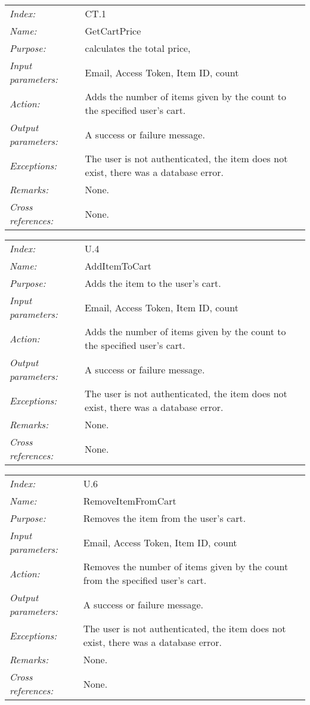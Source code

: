 \documentclass[10pt,letter]{article}
\begin{document}
\begin{tabularx}{\textwidth}{l X}
    \it{Index:} & CT.1 \\
    \it{Name:} & GetCartPrice \\
    \it{Purpose:} & calculates the total price,  \\
    \it{Input parameters:} & Email, Access Token, Item ID, count \\
    \it{Action:} & Adds the number of items given by the count to the specified user's cart. \\
    \it{Output parameters:} & A success or failure message. \\
    \it{Exceptions:} & The user is not authenticated, the item does not exist, there was a database error. \\
    \it{Remarks:} & None. \\
    \it{Cross references:} & None. \\
    \hline
\end{tabularx}

\begin{tabularx}{\textwidth}{l X}
    \it{Index:} & U.4 \\
    \it{Name:} & AddItemToCart \\
    \it{Purpose:} & Adds the item to the user's cart. \\
    \it{Input parameters:} & Email, Access Token, Item ID, count \\
    \it{Action:} & Adds the number of items given by the count to the specified user's cart. \\
    \it{Output parameters:} & A success or failure message. \\
    \it{Exceptions:} & The user is not authenticated, the item does not exist, there was a database error. \\
    \it{Remarks:} & None. \\
    \it{Cross references:} & None. \\
    \hline
\end{tabularx}

\begin{tabularx}{\textwidth}{l X}
    \it{Index:} & U.6 \\
    \it{Name:} & RemoveItemFromCart \\
    \it{Purpose:} & Removes the item from the user's cart. \\
    \it{Input parameters:} & Email, Access Token, Item ID, count \\
    \it{Action:} & Removes the number of items given by the count from the specified user's cart. \\
    \it{Output parameters:} & A success or failure message. \\
    \it{Exceptions:} & The user is not authenticated, the item does not exist, there was a database error. \\
    \it{Remarks:} & None. \\
    \it{Cross references:} & None. \\
    \hline
\end{tabularx}
\end{document}

